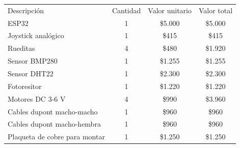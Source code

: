 \documentclass[
11pt, %
codirector, %
]{charter}
\begin{document}
\begin{table}[htpb]
\centering
\begin{tabularx}{\linewidth}{@{}|X|c|r|r|@{}}
\hline
\rowcolor[HTML]{C0C0C0} 
\multicolumn{4}{|c|}{\cellcolor[HTML]{C0C0C0}COSTOS DIRECTOS} \\ \hline
\rowcolor[HTML]{C0C0C0} 
Descripción &
  \multicolumn{1}{c|}{\cellcolor[HTML]{C0C0C0}Cantidad} &
  \multicolumn{1}{c|}{\cellcolor[HTML]{C0C0C0}Valor unitario} &
  \multicolumn{1}{c|}{\cellcolor[HTML]{C0C0C0}Valor total} \\ \hline
 ESP32 & 
  \multicolumn{1}{c|}{1} &
  \multicolumn{1}{c|}{\$5.000} &
  \multicolumn{1}{c|}{\$5.000} \\ \hline
 Joystick analógico &
  \multicolumn{1}{c|}{1} &
  \multicolumn{1}{c|}{\$415} &
  \multicolumn{1}{c|}{\$415} \\ \hline
 Rueditas &
  \multicolumn{1}{c|}{4} &
  \multicolumn{1}{c|}{\$480} &
  \multicolumn{1}{c|}{\$1.920} \\ \hline
 Sensor BMP280 &
  \multicolumn{1}{c|}{1} &
  \multicolumn{1}{c|}{\$1.255} &
  \multicolumn{1}{c|}{\$1.255} \\ \hline
 Sensor DHT22 &
  \multicolumn{1}{c|}{1} &
  \multicolumn{1}{c|}{\$2.300} &
  \multicolumn{1}{c|}{\$2.300} \\ \hline
 Fotoresitor &
  \multicolumn{1}{c|}{1} &
  \multicolumn{1}{c|}{\$1.220} &
  \multicolumn{1}{c|}{\$1.220} \\ \hline
 Motores DC 3-6 V &
  \multicolumn{1}{c|}{4} &
  \multicolumn{1}{c|}{\$990} &
  \multicolumn{1}{c|}{\$3.960} \\ \hline
 Cables dupont macho-macho &
  \multicolumn{1}{c|}{1} &
  \multicolumn{1}{c|}{\$960} &
  \multicolumn{1}{c|}{\$960} \\ \hline
 Cables dupont macho-hembra &
  \multicolumn{1}{c|}{1} &
  \multicolumn{1}{c|}{\$960} &
  \multicolumn{1}{c|}{\$960} \\ \hline
 Plaqueta de cobre para montar &
  \multicolumn{1}{c|}{1} &
  \multicolumn{1}{c|}{\$1.250} &
  \multicolumn{1}{c|}{\$1.250} \\ \hline


\end{tabularx}
\end{table}
\end{document}
